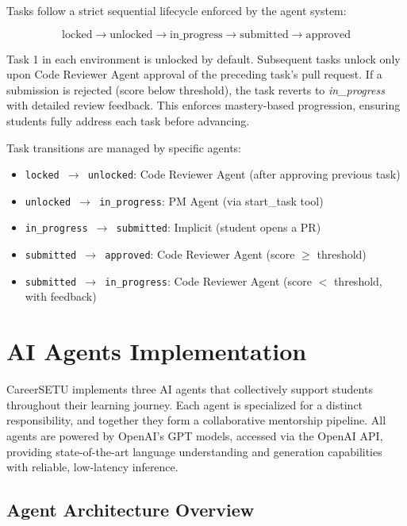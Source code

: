\documentclass[12pt,a4paper]{report}
\begin{document}
Tasks follow a strict sequential lifecycle enforced by the agent system:

\begin{equation}
\text{locked} \rightarrow \text{unlocked} \rightarrow \text{in\_progress} \rightarrow \text{submitted} \rightarrow \text{approved}
\end{equation}

Task 1 in each environment is unlocked by default. Subsequent tasks unlock only upon Code Reviewer Agent approval of the preceding task's pull request. If a submission is rejected (score below threshold), the task reverts to \textit{in\_progress} with detailed review feedback. This enforces mastery-based progression, ensuring students fully address each task before advancing.

Task transitions are managed by specific agents:
\begin{itemize}
    \item \texttt{locked $\rightarrow$ unlocked}: Code Reviewer Agent (after approving previous task)
    \item \texttt{unlocked $\rightarrow$ in\_progress}: PM Agent (via start\_task tool)
    \item \texttt{in\_progress $\rightarrow$ submitted}: Implicit (student opens a PR)
    \item \texttt{submitted $\rightarrow$ approved}: Code Reviewer Agent (score $\geq$ threshold)
    \item \texttt{submitted $\rightarrow$ in\_progress}: Code Reviewer Agent (score $<$ threshold, with feedback)
\end{itemize}


\chapter{AI Agents Implementation}

CareerSETU implements three AI agents that collectively support students throughout their learning journey. Each agent is specialized for a distinct responsibility, and together they form a collaborative mentorship pipeline. All agents are powered by OpenAI's GPT models, accessed via the OpenAI API, providing state-of-the-art language understanding and generation capabilities with reliable, low-latency inference.

\section{Agent Architecture Overview}
\end{document}
